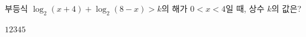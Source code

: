부등식 $\log_2 (x+4)+\log_2 (8-x)>k$의 해가 $0<x<4$일 때, 상수 $k$의 값은?
\begin{choices32}{$1$}{$2$}{$3$}{$4$}{$5$}\end{choices32}
